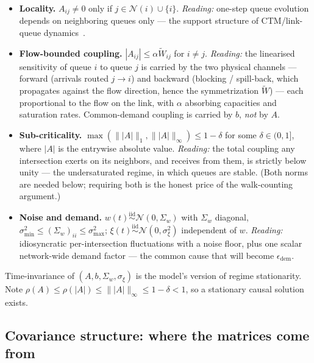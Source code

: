 \documentclass[11pt]{article}
\theoremstyle{definition}
\theoremstyle{remark}
\newcommand{\Wt}{\widetilde{W}}
\begin{document}
\begin{itemize}
    \item[(M1)] \textbf{Locality.} $A_{ij} \neq 0$ only if
          $j \in \mathcal{N}(i) \cup \{i\}$.
          \emph{Reading:} one-step queue evolution depends on neighboring
          queues only --- the support structure of CTM/link-queue
          dynamics~\citep{daganzo1994ctm,jin2012linkqueue}.
    \item[(M2)] \textbf{Flow-bounded coupling.} $|A_{ij}| \leq \alpha
              \Wt_{ij}$ for $i \neq j$.
          \emph{Reading:} the linearised sensitivity of queue $i$ to queue $j$
          is carried by the two physical channels --- forward (arrivals routed
          $j \to i$) and backward (blocking / spill-back, which propagates
          against the flow direction, hence the symmetrization $\Wt$) --- each
          proportional to the flow on the link, with $\alpha$ absorbing
          capacities and saturation rates.
          Common-demand coupling is carried by $b$, \emph{not} by $A$.
    \item[(M3)] \textbf{Sub-criticality.}
          $\max\!\left(\| |A| \|_1, \| |A| \|_\infty\right) \leq 1 - \delta$
          for some $\delta \in (0,1]$, where $|A|$ is the entrywise absolute
          value.
          \emph{Reading:} the total coupling any intersection exerts on its
          neighbors, and receives from them, is strictly below unity --- the
          undersaturated regime, in which queues are stable.
          (Both norms are needed below; requiring both is the honest price of
          the walk-counting argument.)
    \item[(M4)] \textbf{Noise and demand.} $w(t) \overset{\text{iid}}{\sim}
              \mathcal{N}(0, \Sigma_w)$ with $\Sigma_w$ diagonal,
          $\sigma_{\min}^2 \leq (\Sigma_w)_{ii} \leq \sigma_{\max}^2$;
          $\xi(t) \overset{\text{iid}}{\sim} \mathcal{N}(0, \sigma_\xi^2)$
          independent of $w$.
          \emph{Reading:} idiosyncratic per-intersection fluctuations with a
          noise floor, plus one scalar network-wide demand factor --- the
          common cause that will become $\epsilon_{\mathrm{dem}}$.
\end{itemize}

Time-invariance of $(A, b, \Sigma_w, \sigma_\xi)$ is the model's version of
regime stationarity.
Note $\rho(A) \leq \rho(|A|) \leq \| |A| \|_\infty \leq 1 - \delta < 1$, so a
stationary causal solution exists.

\subsection{Covariance structure: where the matrices come from}
\label{sec:cov}
\end{document}
